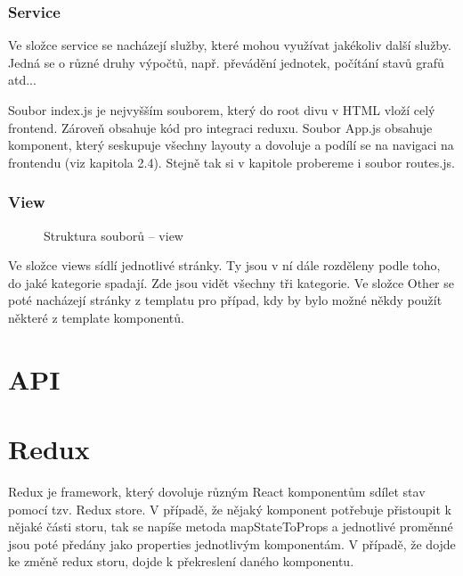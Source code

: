 \documentclass[a4paper,oneside,12pt]{report}
\begin{document}
\subsubsection{Service}


Ve složce service se nacházejí služby, které mohou využívat jakékoliv další služby.
Jedná se o různé druhy výpočtů, např. převádění jednotek, počítání stavů grafů atd...

Soubor index.js je nejvyšším souborem, který do root divu v HTML vloží celý frontend.
Zároveň obsahuje kód pro integraci reduxu.
Soubor App.js obsahuje komponent, který seskupuje všechny layouty a dovoluje a podílí se na navigaci na frontendu (viz kapitola 2.4).
Stejně tak si v kapitole probereme i soubor routes.js.

\newpage
\subsubsection{View}

\begin{figure}[h]
	\caption[Struktura souborů -- view, vlastní tvorba]{Struktura souborů -- view}
	\label{fig:frontendStructureView}
\end{figure}

Ve složce views sídlí jednotlivé stránky.
Ty jsou v ní dále rozděleny podle toho, do jaké kategorie spadají.
Zde jsou vidět všechny tři kategorie.
Ve složce Other se poté nacházejí stránky z templatu pro případ, kdy by bylo možné někdy použít některé z template komponentů.

\newpage
\section{API}


\section{Redux}

Redux je framework, který dovoluje různým React komponentům sdílet stav pomocí tzv. Redux store.
V případě, že nějaký komponent potřebuje přistoupit k nějaké části storu, tak se napíše metoda mapStateToProps a jednotlivé proměnné jsou poté předány jako properties jednotlivým komponentám.
V případě, že dojde ke změně redux storu, dojde k překreslení daného komponentu.
\end{document}
